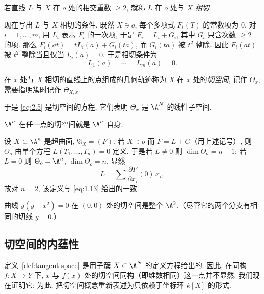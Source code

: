 \begin{definition}[相切]\label{def:tangent-line-def}
	若直线 $L$ 与 $X$ 在 $o$ 处的相交重数 $\ge 2$, 就称 $L$ 在 $o$ 处与 $X$ \emph{相切}.
\end{definition}

现在写出 $L$ 与 $X$ 相切的条件. 既然 $X \ni o$, 每个多项式 $F_i(T)$ 的常数项为 $0$. 对 $i = 1, \ldots, m$, 用 $L_i$ 表示 $F_i$ 的一次项, 于是 $F_i = L_i + G_i$, 其中 $G_i$ 只含次数 $\ge 2$ 的项. 那么 $F_i(at) = t L_i(a) + G_i(ta)$, 而 $G_i(ta)$ 被 $t^2$ 整除. 因此 $F_i(at)$ 被 $t^2$ 整除当且仅当 $L_i(a) = 0$. 于是相切条件为
\begin{equation}
	\label{eq:2.5}
	L_1(a) = \cdots = L_m(a) = 0.
\end{equation}

\begin{definition}[切空间]\label{def:tangent-space}
	在 $x$ 处与 $X$ 相切的直线上的点组成的几何轨迹称为 $X$ 在 $x$ 处的\emph{切空间}, 记作 $\Theta_x$; 需要指明簇时记作 $\Theta_{X,x}$.
\end{definition}

于是 \eqref{eq:2.5} 是切空间的方程, 它们表明 $\Theta_x$ 是 $\A^N$ 的线性子空间.

\begin{example}\label{exam:tangent-An}
	$\A^n$ 在任一点的切空间就是 $\A^n$ 自身.
\end{example}

\begin{example}\label{exam:tangent-hypersurface}
	设 $X \subset \A^n$ 是超曲面, $\mathfrak A_X = (F)$. 若 $X \ni o$ 而 $F = L + G$（用上述记号）, 则 $\Theta_o$ 由单个方程 $L(T_1, \ldots, T_n) = 0$ 定义. 于是若 $L \ne 0$ 则 $\dim \Theta_o = n-1$; 若 $L = 0$ 则 $\Theta_o = \A^n$, $\dim \Theta_o = n$. 显然
	\[
		L = \sum \frac{\partial F}{\partial x_i}(0)\, x_i,
	\]
	故对 $n = 2$, 该定义与 \eqref{eq:1.13} 给出的一致.
\end{example}

\begin{example}\label{exam:tangent-node}
	曲线 $y(y - x^2) = 0$ 在 $(0,0)$ 处的切空间是整个 $\A^2$.（尽管它的两个分支有相同的切线 $y = 0$.）
\end{example}

\subsection{切空间的内蕴性}

定义~\ref{def:tangent-space} 是用子簇 $X \subset \A^N$ 的定义方程给出的. 因此, 在同构 $f: X \to Y$ 下, $x$ 与 $f(x)$ 处的切空间同构（即维数相同）这一点并不显然. 我们现在证明它; 为此, 把切空间概念重新表述为只依赖于坐标环 $k[X]$ 的形式.

